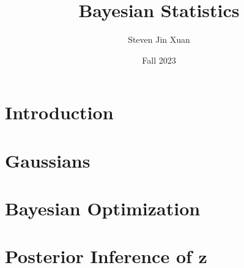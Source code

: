 \documentclass{article}[10, letterpaper]
\author{Steven Jin Xuan}
\date{Fall 2023}
\title{Bayesian Statistics}
\begin{document}

\section{Introduction}

\section{Gaussians}



\section{Bayesian Optimization}


\section{Posterior Inference of $\mathbf{z}$}


{}

\end{document}
